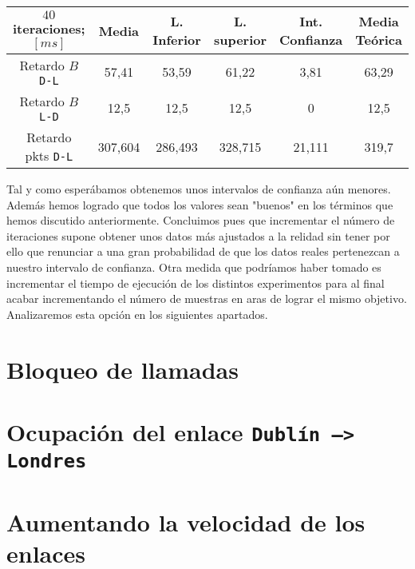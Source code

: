 \documentclass{article}[10pt]
\begin{document}
		\vskip 3mm

		\begin{tabular}{| c | c | c | c | c | c |}
			\hline
			$40$ iteraciones; $[ms]$ & Media & L. Inferior & L. superior & Int. Confianza & Media Teórica\\
			\hline
			Retardo $B$ \texttt{D-L} & 57,41 & 53,59 & 61,22 & 3,81 & 63,29\\
			\hline
			Retardo $B$ \texttt{L-D} & 12,5 & 12,5 & 12,5 & 0 & 12,5\\
			\hline
			Retardo pkts \texttt{D-L} & 307,604 & 286,493 & 328,715 & 21,111 & 319,7\\
			\hline
		\end{tabular}

		\vskip 3mm

		Tal y como esperábamos obtenemos unos intervalos de confianza aún menores. Además hemos logrado que todos los valores sean "buenos" en los términos que hemos discutido anteriormente. Concluimos pues que incrementar el número de iteraciones supone obtener unos datos más ajustados a la relidad sin tener por ello que renunciar a una gran probabilidad de que los datos reales pertenezcan a nuestro intervalo de confianza. Otra medida que podríamos haber tomado es incrementar el tiempo de ejecución de los distintos experimentos para al final acabar incrementando el número de muestras en aras de lograr el mismo objetivo. Analizaremos esta opción en los siguientes apartados.

	\section{Bloqueo de llamadas}

	\section{Ocupación del enlace \texttt{Dublín --> Londres}}

	\section{Aumentando la velocidad de los enlaces}
\end{document}
